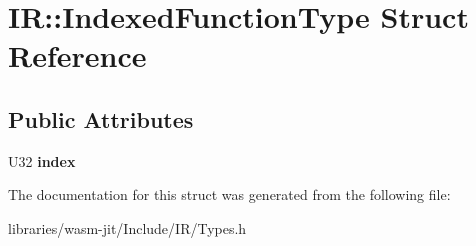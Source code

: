 \hypertarget{struct_i_r_1_1_indexed_function_type}{}\section{IR\+:\+:Indexed\+Function\+Type Struct Reference}
\label{struct_i_r_1_1_indexed_function_type}
\subsection*{Public Attributes}
\begin{DoxyCompactItemize}
\item 
\mbox{\label{struct_i_r_1_1_indexed_function_type_ad76a69c366f186a0e17305099ea15aba}} 
U32 {\bfseries index}
\end{DoxyCompactItemize}


The documentation for this struct was generated from the following file\+:\begin{DoxyCompactItemize}
\item 
libraries/wasm-\/jit/\+Include/\+I\+R/Types.\+h\end{DoxyCompactItemize}
